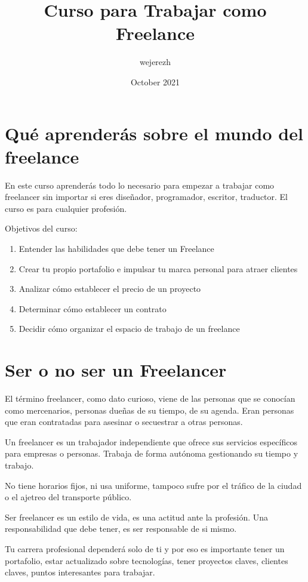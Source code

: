 \documentclass{article}
\title{Curso para Trabajar como Freelance}
\author{wejerezh }
\date{October 2021}
\begin{document}

\newpage
{}
\tableofcontents
\newpage

\section{Qué aprenderás sobre el mundo del freelance}
    En este curso aprenderás todo lo necesario para empezar a trabajar como freelancer sin importar si eres diseñador, programador, escritor, traductor. El curso es para cualquier profesión.
    
    Objetivos del curso:
    \begin{enumerate}
        \item Entender las habilidades que debe tener un Freelance
        \item Crear tu propio portafolio e impulsar tu marca personal para atraer clientes
        \item Analizar cómo establecer el precio de un proyecto
        \item Determinar cómo establecer un contrato
        \item Decidir cómo organizar el espacio de trabajo de un freelance
    \end{enumerate}
\section{Ser o no ser un Freelancer} 
    El término freelancer, como dato curioso, viene de las personas que se conocían como mercenarios, personas dueñas de su tiempo, de su agenda. Eran personas que eran contratadas para asesinar o secuestrar a otras personas.
    
    Un freelancer es un trabajador independiente que ofrece sus servicios específicos para empresas o personas. Trabaja de forma autónoma gestionando su tiempo y trabajo.
    
    No tiene horarios fijos, ni usa uniforme, tampoco sufre por el tráfico de la ciudad o el ajetreo del transporte público.
    
    Ser freelancer es un estilo de vida, es una actitud ante la profesión. Una responsabilidad que debe tener, es ser responsable de si mismo.
    
    Tu carrera profesional dependerá solo de ti y por eso es importante tener un portafolio, estar actualizado sobre tecnologías, tener proyectos claves, clientes claves, puntos interesantes para trabajar.
\end{document}
